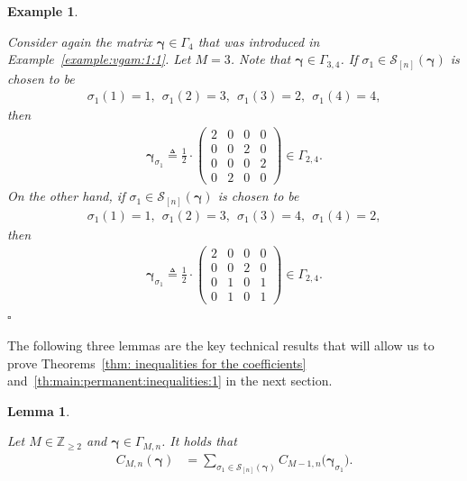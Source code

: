 \documentclass[journal,lettersize,twocolumn]{IEEEtran} %
\newtheorem{lemma}[theorem]{Lemma}
\newtheorem{example}[theorem]{Example}
\newcommand{\eexample}{\hfill$\square$}
\newcommand{\vect}[1]{ \bm{#1} }
\newcommand{\set}[1]{\mathcal{#1}}
\newcommand{\vgam}{ \vect{\gamma} }
\newcommand{\sZ}{\mathbb{Z}}
\newcommand{\defeq}{ \triangleq }
\newcommand{\setS}{\set{S}}
\newcommand{\CM}[1]{\Cgen{M}{#1}}
\newcommand{\Cgen}[2]{C_{#1,#2}}
\begin{document}
\begin{example}
  \label{example:vgam:1:2}

  Consider again the matrix $\vgam \in \Gamma_4$ that was introduced in
  Example~\ref{example:vgam:1:1}. Let $M = 3$. Note that
  $ \vgam \in \Gamma_{3,4} $. If $\sigma_1 \in \setS_{[n]}(\vgam)$ is chosen
  to be
  \begin{align*}
    \sigma_1(1) = 1, \ \ 
    \sigma_1(2) = 3, \ \ 
    \sigma_1(3) = 2, \ \ 
    \sigma_1(4) = 4,
  \end{align*}
  then
  \begin{align*}
    \vgam_{\sigma_1}
       \defeq
         \frac{1}{2}
         \cdot
         \begin{pmatrix}
           2 & 0 & 0 & 0 \\
           0 & 0 & 2 & 0 \\
           0 & 0 & 0 & 2 \\
           0 & 2 & 0 & 0
         \end{pmatrix}
           \in \Gamma_{2,4}.
  \end{align*}
  On the other hand, if $\sigma_1 \in \setS_{[n]}(\vgam)$ is
  chosen to be
  \begin{align*}
    \sigma_1(1) = 1, \ \ 
    \sigma_1(2) = 3, \ \ 
    \sigma_1(3) = 4, \ \ 
    \sigma_1(4) = 2,
  \end{align*}
  then
  \begin{align*}
    \vgam_{\sigma_1}
       \defeq
         \frac{1}{2}
         \cdot
         \begin{pmatrix}
           2 & 0 & 0 & 0 \\
           0 & 0 & 2 & 0 \\
           0 & 1 & 0 & 1 \\
           0 & 1 & 0 & 1
         \end{pmatrix}
           \in \Gamma_{2,4}.
  \end{align*}
  \eexample
\end{example}

%

The following three lemmas are the key technical results that will allow us to
prove Theorems~\ref{thm: inequalities for the coefficients}
and~\ref{th:main:permanent:inequalities:1} in the next section.

%

\begin{lemma}
  \label{sec:1:lem:29:copy:2}
  
  Let $ M \in \sZ_{\geq 2} $ and $ \vgam \in \Gamma_{M,n} $. It holds that
  \begin{align*}
     \CM{n}( \vgam )
        &= \sum_{\sigma_1 \in \setS_{[n]}( \vgam )}
             \Cgen{M-1}{n}\bigl( 
                \vgam_{\sigma_1}
        \bigr).
    \end{align*}
\end{lemma}
\end{document}
